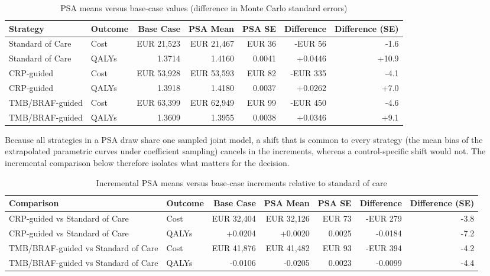 \documentclass[
  11pt,
  a4paper]{article}
\begin{document}
\begin{table}[H]

\caption{PSA means versus base-case values (difference in Monte Carlo standard errors)}
\centering
\begin{tabular}[t]{llrrrrr}
\toprule
Strategy & Outcome & Base Case & PSA Mean & PSA SE & Difference & Difference (SE)\\
\midrule
Standard of Care & Cost & EUR 21,523 & EUR 21,467 & EUR 36 & -EUR 56 & -1.6\\
Standard of Care & QALYs & 1.3714 & 1.4160 & 0.0041 & +0.0446 & +10.9\\
CRP-guided & Cost & EUR 53,928 & EUR 53,593 & EUR 82 & -EUR 335 & -4.1\\
CRP-guided & QALYs & 1.3918 & 1.4180 & 0.0037 & +0.0262 & +7.0\\
TMB/BRAF-guided & Cost & EUR 63,399 & EUR 62,949 & EUR 99 & -EUR 450 & -4.6\\
\addlinespace
TMB/BRAF-guided & QALYs & 1.3609 & 1.3955 & 0.0038 & +0.0346 & +9.1\\
\bottomrule
\end{tabular}
\end{table}

Because all strategies in a PSA draw share one sampled joint model, a
shift that is common to every strategy (the mean bias of the
extrapolated parametric curves under coefficient sampling) cancels in
the increments, whereas a control-specific shift would not. The
incremental comparison below therefore isolates what matters for the
decision.

\begin{table}[H]

\caption{Incremental PSA means versus base-case increments relative to standard of care}
\centering
\begin{tabular}[t]{llrrrrr}
\toprule
Comparison & Outcome & Base Case & PSA Mean & PSA SE & Difference & Difference (SE)\\
\midrule
CRP-guided vs Standard of Care & Cost & EUR 32,404 & EUR 32,126 & EUR 73 & -EUR 279 & -3.8\\
CRP-guided vs Standard of Care & QALYs & +0.0204 & +0.0020 & 0.0025 & -0.0184 & -7.2\\
TMB/BRAF-guided vs Standard of Care & Cost & EUR 41,876 & EUR 41,482 & EUR 93 & -EUR 394 & -4.2\\
TMB/BRAF-guided vs Standard of Care & QALYs & -0.0106 & -0.0205 & 0.0023 & -0.0099 & -4.4\\
\bottomrule
\end{tabular}
\end{table}
\end{document}
